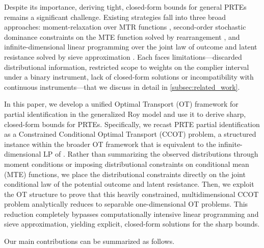 Despite its importance, deriving tight, closed-form bounds for general PRTEs remains a significant challenge. Existing strategies fall into three broad approaches: moment-relaxation over MTR functions \citep{magne2018using,mogstad2018identification}, second-order stochastic dominance constraints on the MTE function solved by rearrangement \citep{marx2024sharp}, and infinite-dimensional linear programming over the joint law of outcome and latent resistance solved by sieve approximation \citep{han_yang2024computational}. Each faces limitations---discarded distributional information, restricted scope to weights on the complier interval under a binary instrument, lack of closed-form solutions or incompatibility with continuous instruments---that we discuss in detail in \cref{subsec:related_work}.

In this paper, we develop a unified Optimal Transport (OT) framework for partial identification in the generalized Roy model and use it to derive sharp, closed-form bounds for PRTEs. Specifically, we recast PRTE partial identification as a Constrained Conditional Optimal Transport (CCOT) problem, a structured instance within the broader OT framework that is equivalent to the infinite-dimensional LP of \citet{han_yang2024computational}. Rather than summarizing the observed distributions through moment conditions or imposing distributional constraints on conditional mean (MTE) functions, we place the distributional constraints directly on the joint conditional law of the potential outcome and latent resistance. Then, we exploit the OT structure to prove that this heavily constrained, multidimensional CCOT problem analytically reduces to separable one-dimensional OT problems. This reduction completely bypasses computationally intensive linear programming and sieve approximation, yielding explicit, closed-form solutions for the sharp bounds. 

Our main contributions can be summarized as follows.

